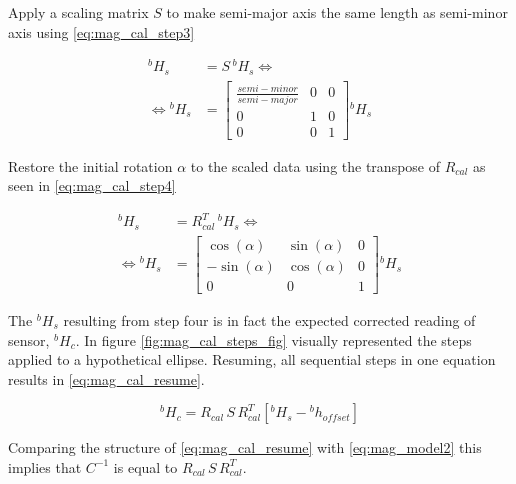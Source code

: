  Apply a scaling matrix $S$ to make semi-major axis the same length as semi-minor axis using \eqref{eq:mag_cal_step3}

\begin{equation}
\begin{aligned}
{}^bH_{s}&=S\,{}^bH_{s}\Leftrightarrow\\
\Leftrightarrow{}^bH_{s}&=\begin{bmatrix}
\frac{semi-minor}{semi-major} & 0 & 0\\
0 & 1 & 0\\
0 & 0 & 1
\end{bmatrix}{}^bH_{s}
\end{aligned}
\label{eq:mag_cal_step3}
\end{equation}

 Restore the initial rotation $\alpha$ to the scaled data using the transpose of $R_{cal}$ as seen in \eqref{eq:mag_cal_step4}

\begin{equation}
\begin{aligned}
{}^bH_{s}&=R^T_{cal}\,{}^bH_{s}\Leftrightarrow\\
\Leftrightarrow{}^bH_{s}&=\begin{bmatrix}
\cos(\alpha) & \sin(\alpha) & 0\\
-\sin(\alpha) & \cos(\alpha)  & 0\\
0			 & 0			 & 1
\end{bmatrix}{}^bH_{s}
\end{aligned}
\label{eq:mag_cal_step4}
\end{equation}

The ${}^bH_{s}$ resulting from step four is in fact the expected
corrected reading of sensor, ${}^bH_{c}$. In figure
\ref{fig:mag_cal_steps_fig} visually represented the steps applied to a
hypothetical ellipse. Resuming, all sequential steps in one equation results in
\eqref{eq:mag_cal_resume}.

\begin{equation}
{}^bH_{c}=R_{cal}\,S\,R^T_{cal}[{}^bH_{s}-{}^bh_{offset}]
\label{eq:mag_cal_resume}
\end{equation}

Comparing the structure of \eqref{eq:mag_cal_resume} with \eqref{eq:mag_model2} this implies that $C^{-1}$ is equal to $R_{cal}\,S\,R^T_{cal}$. 

